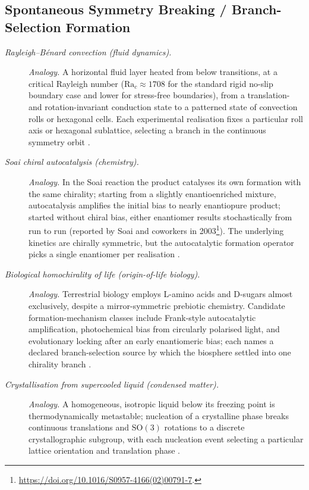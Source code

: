 \subsection*{ Spontaneous Symmetry Breaking / Branch-Selection Formation}
\begingroup\small
\begin{description}
\item[\emph{Rayleigh--B{\'e}nard convection (fluid dynamics).}] \textit{Analogy.}
A horizontal fluid layer heated from below transitions, at a
critical Rayleigh number (\(\mathrm{Ra}_c\approx 1708\) for the
standard rigid no-slip boundary case and lower for stress-free
boundaries), from a translation- and rotation-invariant
conduction state to a patterned state of convection rolls or
hexagonal cells.  Each experimental realisation fixes a particular
roll axis or hexagonal sublattice, selecting a branch in the
continuous symmetry orbit
\citep{Chandrasekhar1961HydrodynamicStability}.

\item[\emph{Soai chiral autocatalysis (chemistry).}] \textit{Analogy.}
In the Soai reaction the product catalyses its own formation with
the same chirality; starting from a slightly enantioenriched mixture, autocatalysis amplifies the initial bias to nearly enantiopure product; started without chiral bias, either enantiomer results stochastically from run to run (reported by Soai and coworkers in 2003\footnote{\url{https://doi.org/10.1016/S0957-4166(02)00791-7}.}).  The underlying kinetics are chirally symmetric, but the
autocatalytic formation operator picks a single enantiomer per
realisation
\citep{SoaiShibataMoriokaChoji1995AsymmetricAutocatalysis}.

\item[\emph{Biological homochirality of life (origin-of-life
biology).}] \textit{Analogy.}
Terrestrial biology employs L-amino acids and D-sugars almost
exclusively, despite a mirror-symmetric prebiotic chemistry.
Candidate  formation-mechanism classes include
Frank-style autocatalytic amplification, photochemical bias from
circularly polarised light, and evolutionary locking after an
early enantiomeric bias; each names a declared branch-selection
source by which the biosphere settled into one chirality branch
\citep{Bonner1991OriginAmplificationBiomolecularChirality}.

\item[\emph{Crystallisation from supercooled liquid (condensed
matter).}] \textit{Analogy.}
A homogeneous, isotropic liquid below its freezing point is
thermodynamically metastable; nucleation of a crystalline phase
breaks continuous translations and \(\mathrm{SO}(3)\) rotations to
a discrete crystallographic subgroup, with each nucleation event
selecting a particular lattice orientation and translation phase
\citep{Turnbull1950FormationCrystalNuclei}.
\end{description}
\endgroup

